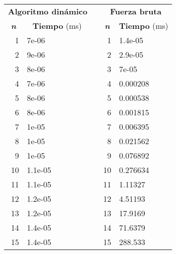 \documentclass[10pt, a4paper]{article}
\theoremstyle{theorem-style}
\theoremstyle{theorem-style}
\theoremstyle{definition-style}
\theoremstyle{remark-style}
\theoremstyle{example-style}
\theoremstyle{definition-style}
\theoremstyle{remark-style}
\begin{document}
\begin{table}[h]
\centering
\begin{tabular}{|r|l|l|r|l|}
\cline{1-2} \cline{4-5}
\multicolumn{2}{c}{\cellcolor[HTML]{4DB6AC}\textbf{Algoritmo dinámico}} & & \multicolumn{2}{c}{\cellcolor[HTML]{4DB6AC}\textbf{Fuerza bruta}} \\
\cline{1-2} \cline{4-5}
\multicolumn{1}{c}{\cellcolor[HTML]{80CBC4}\textbf{\emph{n}}} & \multicolumn{1}{c}{\cellcolor[HTML]{80CBC4}\textbf{Tiempo} (ms)} & & \multicolumn{1}{c}{\cellcolor[HTML]{80CBC4}\textbf{\emph{n}}} & \multicolumn{1}{c}{\cellcolor[HTML]{80CBC4}\textbf{Tiempo} (ms)}\\
\cline{1-2} \cline{4-5}
1 & 7e-06 & & 1 & 1.4e-05  \\
 2 & 9e-06 & & 2 & 2.9e-05  \\
 3 & 8e-06 & & 3 & 7e-05  \\
4 &  7e-06 & & 4 &  0.000208\\
 5 & 8e-06 & & 5 & 0.000538  \\
6 & 8e-06 & & 6 & 0.001815  \\
 7 & 1e-05 & & 7 & 0.006395  \\
8 & 1e-05 & & 8 & 0.021562  \\
 9 & 1e-05 & &  9 & 0.076892  \\
 10 & 1.1e-05 & & 10 & 0.276634  \\
 11 & 1.1e-05 & & 11 & 1.11327 \\
  12 & 1.2e-05 & &  12 & 4.51193  \\
 13 & 1.2e-05 & & 13 & 17.9169  \\
 14 & 1.4e-05 & & 14 & 71.6379 \\
 15 & 1.4e-05 & & 15 & 288.533 \\
 \cline{1-2} \cline{4-5}

\end{tabular}
\end{table}
\end{document}
